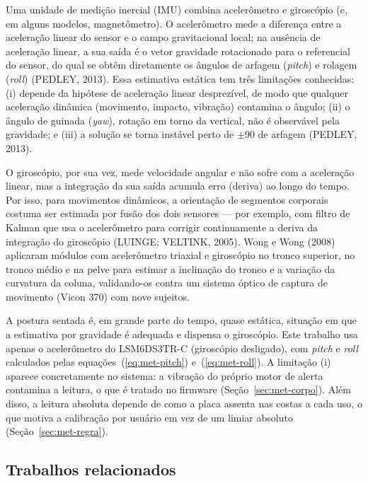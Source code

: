 Uma unidade de medição inercial (IMU) combina acelerômetro e giroscópio (e, em
alguns modelos, magnetômetro). O acelerômetro mede a diferença entre a aceleração
linear do sensor e o campo gravitacional local; na ausência de aceleração linear,
a sua saída é o vetor gravidade rotacionado para o referencial do sensor, do qual
se obtêm diretamente os ângulos de arfagem (\emph{pitch}) e rolagem (\emph{roll})
(PEDLEY, 2013). Essa estimativa estática tem três limitações conhecidas: (i) depende
da hipótese de aceleração linear desprezível, de modo que qualquer aceleração
dinâmica (movimento, impacto, vibração) contamina o ângulo; (ii) o ângulo de
guinada (\emph{yaw}), rotação em torno da vertical, não é observável pela
gravidade; e (iii) a solução se torna instável perto de $\pm$90\degree{} de
arfagem (PEDLEY, 2013).

O giroscópio, por sua vez, mede velocidade angular e não sofre com a aceleração
linear, mas a integração da sua saída acumula erro (deriva) ao longo do tempo.
Por isso, para movimentos dinâmicos, a orientação de segmentos corporais costuma
ser estimada por fusão dos dois sensores --- por exemplo, com filtro de Kalman que
usa o acelerômetro para corrigir continuamente a deriva da integração do
giroscópio (LUINGE; VELTINK, 2005). Wong e Wong (2008) aplicaram módulos com
acelerômetro triaxial e giroscópio no tronco superior, no tronco médio e na pelve
para estimar a inclinação do tronco e a variação da curvatura da coluna,
validando-os contra um sistema óptico de captura de movimento (Vicon 370) com nove
sujeitos.

A postura sentada é, em grande parte do tempo, quase estática, situação em que a
estimativa por gravidade é adequada e dispensa o giroscópio. Este trabalho usa
apenas o acelerômetro do LSM6DS3TR-C (giroscópio desligado), com
\emph{pitch} e \emph{roll} calculados pelas equações~(\ref{eq:met-pitch})
e~(\ref{eq:met-roll}). A limitação (i) aparece concretamente no sistema: a vibração
do próprio motor de alerta contamina a leitura, o que é tratado no firmware
(Seção~\ref{sec:met-corpo}). Além disso, a leitura absoluta depende de como a placa
assenta nas costas a cada uso, o que motiva a calibração por usuário em vez de um
limiar absoluto (Seção~\ref{sec:met-regra}).

\subsection{Trabalhos relacionados}
\label{sec:rev-relacionados}

